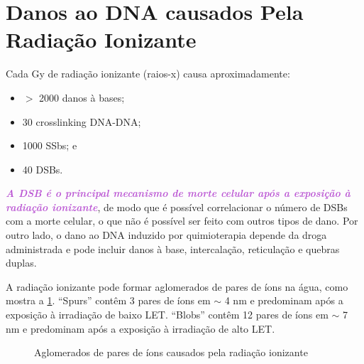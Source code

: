 \documentclass[11pt,a4paper]{article}
\begin{document}
\section{Danos ao DNA causados Pela Radiação Ionizante}

	Cada Gy de radiação ionizante (raios-x) causa aproximadamente:

	\begin{itemize}[label=\textcolor{CarnationPink}{$\blacktriangleright$}]
		\item $>$ 2000 danos à bases;
		\item 30 crosslinking DNA-DNA;
		\item 1000 SSbs; e
		\item 40 DSBs.
	\end{itemize}

	\textcolor{MediumOrchid}{\textbf{\textit{A DSB é o principal mecanismo de morte celular após a exposição à radiação ionizante}}}, de modo que é possível correlacionar o número de DSBs com a morte celular, o que não é possível ser feito com outros tipos de dano. Por outro lado, o dano ao DNA induzido por quimioterapia depende da droga administrada e pode incluir danos à base, intercalação, reticulação e quebras duplas. 

	A radiação ionizante pode formar aglomerados de pares de íons na água, como mostra a \ref{fig:spurEBlob}. “Spurs” contêm 3 pares de íons em $\sim$ 4 nm e predominam após a exposição à irradiação de baixo LET. “Blobs” contêm 12 pares de íons em $\sim$ 7 nm e predominam após a exposição à irradiação de alto LET.

	\begin{figure}[h]
		\centering
		\caption{Aglomerados de pares de íons causados pela radiação ionizante}
		\label{fig:spurEBlob}
	\end{figure}
\end{document}
